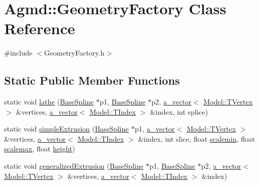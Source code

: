 \hypertarget{class_agmd_1_1_geometry_factory}{\section{Agmd\+:\+:Geometry\+Factory Class Reference}
\label{class_agmd_1_1_geometry_factory}
}


{\ttfamily \#include $<$Geometry\+Factory.\+h$>$}

\subsection*{Static Public Member Functions}
\begin{DoxyCompactItemize}
\item 
static void \hyperlink{class_agmd_1_1_geometry_factory_a557c469b7b88ef313675962abc717c83}{lathe} (\hyperlink{class_agmd_1_1_base_spline}{Base\+Spline} $\ast$p1, \hyperlink{class_agmd_1_1_base_spline}{Base\+Spline} $\ast$p2, \hyperlink{_vector_8h_a3df82cea60ff4ad0acb44e58454406a5}{a\+\_\+vector}$<$ \hyperlink{struct_agmd_1_1_model_1_1_t_vertex}{Model\+::\+T\+Vertex} $>$ \&vertices, \hyperlink{_vector_8h_a3df82cea60ff4ad0acb44e58454406a5}{a\+\_\+vector}$<$ \hyperlink{class_agmd_1_1_model_aca4a6ee5402b386a0b9d0aea52c71eaa}{Model\+::\+T\+Index} $>$ \&index, int splice)
\item 
static void \hyperlink{class_agmd_1_1_geometry_factory_a4df3eb979884b3694634ce6a92caa328}{simple\+Extrusion} (\hyperlink{class_agmd_1_1_base_spline}{Base\+Spline} $\ast$p1, \hyperlink{_vector_8h_a3df82cea60ff4ad0acb44e58454406a5}{a\+\_\+vector}$<$ \hyperlink{struct_agmd_1_1_model_1_1_t_vertex}{Model\+::\+T\+Vertex} $>$ \&vertices, \hyperlink{_vector_8h_a3df82cea60ff4ad0acb44e58454406a5}{a\+\_\+vector}$<$ \hyperlink{class_agmd_1_1_model_aca4a6ee5402b386a0b9d0aea52c71eaa}{Model\+::\+T\+Index} $>$ \&index, int slice, float \hyperlink{_examples_2_bezier_2_app_8cpp_a8e28906cfe47c7da5f52a199dcb1858e}{scalemin}, float \hyperlink{_examples_2_bezier_2_app_8cpp_a8b7ff52385dadb99acacb3e68a2a5c6d}{scalemax}, float \hyperlink{_examples_2_bezier_2_app_8cpp_a48083b65ac9a863566dc3e3fff09a5b4}{height})
\item 
static void \hyperlink{class_agmd_1_1_geometry_factory_a64f2abf6a6d4806d53990b4998479140}{generalized\+Extrusion} (\hyperlink{class_agmd_1_1_base_spline}{Base\+Spline} $\ast$p1, \hyperlink{class_agmd_1_1_base_spline}{Base\+Spline} $\ast$p2, \hyperlink{_vector_8h_a3df82cea60ff4ad0acb44e58454406a5}{a\+\_\+vector}$<$ \hyperlink{struct_agmd_1_1_model_1_1_t_vertex}{Model\+::\+T\+Vertex} $>$ \&vertices, \hyperlink{_vector_8h_a3df82cea60ff4ad0acb44e58454406a5}{a\+\_\+vector}$<$ \hyperlink{class_agmd_1_1_model_aca4a6ee5402b386a0b9d0aea52c71eaa}{Model\+::\+T\+Index} $>$ \&index)

\end{DoxyCompactItemize}
